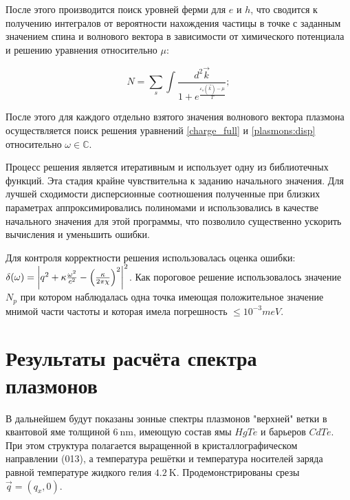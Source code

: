 \documentclass[../main.tex]{subfiles}
\begin{document}
    После этого производится поиск уровней ферми для $e$ и $h$, что сводится к получению
    интегралов от вероятности нахождения частицы в точке с заданным значением спина
    и волнового вектора в зависимости от химического потенциала и решению 
    уравнения относительно $\mu$:

    \begin{equation}
        N = \sum_s \int \frac{d^2 \vec k}{1 + e^\frac{\varepsilon_s(\vec k) - \mu}{T}};
    \end{equation}

    После этого для каждого отдельно взятого значения волнового вектора плазмона 
    осуществляется поиск решения уравнений \ref{charge_full} и \ref{plasmons:disp}
    относительно $\omega \in \mathbb{C}$.

    Процесс решения является итеративным и использует одну из библиотечных функций.
    Эта стадия крайне чувствительна к заданию начального значения. Для лучшей 
    сходимости дисперсионные соотношения полученные при близких параметрах 
    аппроксимировались полиномами и использовались в качестве начального значения для
    этой программы, что позволило существенно ускорить вычисления и уменьшить ошибки.


    Для контроля корректности решения использовалась оценка ошибки:
    $\delta(\omega) = \abs{q^2 + \kappa \frac{\omega^2}{c^2} - 
    \left(\frac{\kappa}{2\pi \chi}\right)^2}^2$. 
    Как пороговое решение использовалось значение $N_p$ при котором наблюдалась 
    одна точка имеющая положительное значение мнимой части частоты и которая 
    имела погрешность $\leq 10^{-3} meV$.


    \section{Результаты расчёта спектра плазмонов}


    В дальнейшем будут показаны зонные спектры плазмонов "верхней" ветки в 
    квантовой яме толщиной $6~\text{nm}$, имеющую состав ямы $HgTe$ и 
    барьеров $CdTe$. При этом структура полагается выращенной в кристаллографическом
    направлении (013), а температура решётки и температура носителей заряда равной 
    температуре жидкого гелия $4.2~\text{K}$. Продемонстрированы срезы 
    $\vec q = (q_x, 0)$.
\end{document}
